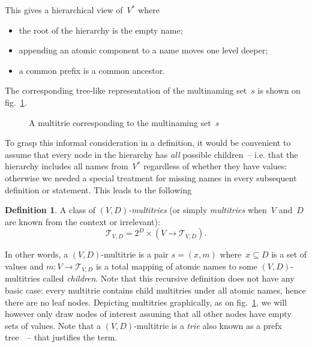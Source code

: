 \documentclass{article}
\theoremstyle{definition}
\newtheorem{Df}{Definition}
\newcommand{\setcharmt}{T}
\newcommand{\setsymbol}[3]{\mathcal{#1}_{#2,#3}}
\newcommand{\setmt}[2]{\setsymbol{\setcharmt}{#1}{#2}}
\begin{document}
This gives a hierarchical view of~$V^\ast$ where
\begin{itemize}
\item the root of the hierarchy is the empty name;
\item appending an atomic component to a name moves one level deeper;
\item a common prefix is a common ancestor.
\end{itemize}
The corresponding tree-like representation of the multinaming set~$s$ is shown on
fig.~\ref{fig:trie}.

\begin{figure}[ht]
\begin{center}
\begin{minipage}{17em}
\end{minipage}
\end{center}
\caption{A multitrie corresponding to the multinaming set~$s$}\label{fig:trie}
\end{figure}

To grasp this informal consideration in a definition, it would be convenient to
assume that every node in the hierarchy has \emph{all} possible children~-- i.e.
that the hierarchy includes all names from~$V^\ast$ regardless of whether they
have values: otherwise we needed a special treatment for missing names in
every subsequent definition or statement. This leads to the following

\begin{Df}\label{df:mt}
A class of \emph{$(V,D)$-multitries} (or simply \emph{multitries} when~$V$
and~$D$ are known from the context or irrelevant):
\[
  \setmt{V}{D} = 2^D \times (V \to \setmt{V}{D}) .
\]
\end{Df}

In other words, a $(V,D)$-multitrie is a pair $s = (x, m)$ where~$x\subseteq D$
is a set of values and $m: V \to \setmt{V}{D}$ is a total mapping of
atomic names to some $(V,D)$-multitries called \emph{children}.
Note that this recursive definition does
not have any basic case: every multitrie contains child multitries
under all atomic names, hence there are no leaf nodes.
Depicting multitries graphically, as on fig.~\ref{fig:trie}, we will however
only draw nodes of interest assuning that all other nodes have empty sets of
values.  Note that a $(V,D)$-multitrie is a \emph{trie} also known as
a prefx tree~\cite{bib:knuth-trie}~-- that justifies the term.
\end{document}
